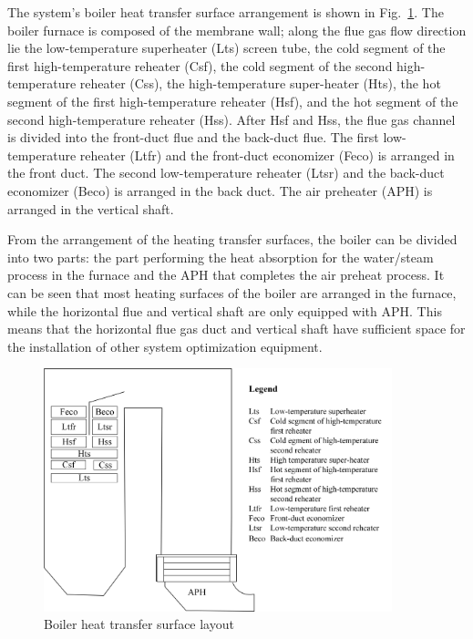 \documentclass[preprint,12pt]{elsarticle}
\begin{document}
The system's boiler heat transfer surface arrangement is shown in Fig.~\ref{fig:boiler_surface}. 
The boiler furnace is composed of the membrane wall; along the flue gas flow direction lie the low-temperature superheater (Lts) screen tube, the cold segment of the first high-temperature reheater (Csf), the cold segment of the second high-temperature reheater (Css), the high-temperature super-heater (Hts), the hot segment of the first high-temperature reheater (Hsf), and the hot segment of the second high-temperature reheater (Hss).
After Hsf and Hss, the flue gas channel is divided into the front-duct flue and the back-duct flue.
The first low-temperature reheater (Ltfr) and the front-duct economizer (Feco) is arranged in the front duct.
The second low-temperature reheater (Ltsr) and the back-duct economizer (Beco) is arranged in the back duct.
The air preheater (APH) is arranged in the vertical shaft.

From the arrangement of the heating transfer surfaces, the boiler can be divided into two parts: the part performing the heat absorption for the water/steam process in the furnace and the APH that completes the air preheat process.
It can be seen that most heating surfaces of the boiler are arranged in the furnace, while the horizontal flue and vertical shaft are only equipped with APH.
This means that the horizontal flue gas duct and vertical shaft have sufficient space for the installation of other system optimization equipment.

\begin{figure}[htbp]
\centering
\includegraphics[width=0.9\textwidth]{fig/boiler_surface.png}
\caption{Boiler heat transfer surface layout} 
\label{fig:boiler_surface}
\end{figure}
\end{document}

